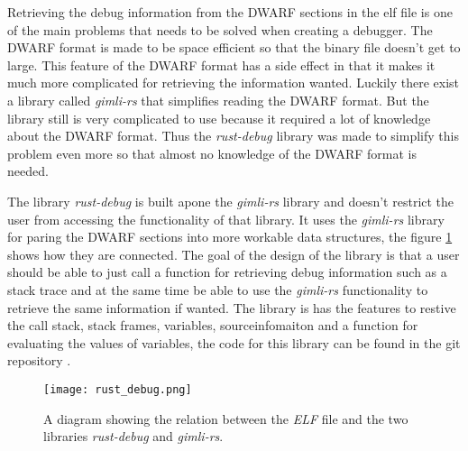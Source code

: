 
Retrieving the debug information from the \gls{DWARF} sections in the \gls{elf} file is one of the main problems that needs to be solved when creating a debugger.
The \gls{DWARF} format is made to be space efficient so that the binary file doesn't get to large.
This feature of the \gls{DWARF} format has a side effect in that it makes it much more complicated for retrieving the information wanted.
Luckily there exist a library called \emph{gimli-rs}\cite{gimli} that simplifies reading the \gls{DWARF} format.
But the library still is very complicated to use because it required a lot of knowledge about the \gls{DWARF} format.
Thus the \emph{rust-debug} library was made to simplify this problem even more so that almost no knowledge of the \gls{DWARF} format is needed.


The library \emph{rust-debug} is built apone the \emph{gimli-rs} library and doesn't restrict the user from accessing the functionality of that library.
It uses the \emph{gimli-rs} library for paring the \gls{DWARF} sections into more workable data structures, the figure \ref{fig:rustdebug} shows how they are connected.
The goal of the design of the library is that a user should be able to just call a function for retrieving debug information such as a stack trace and at the same time be able to use the \emph{gimli-rs} functionality to retrieve the same information if wanted.
The library is has the features to restive the call stack, stack frames, variables, sourceinfomaiton and a function for evaluating the values of variables, the code for this library can be found in the git repository \cite{rust-debug}.


\begin{figure}[h]
	\centering
	\texttt{[image: rust\_debug.png]}
	\caption{A diagram showing the relation between the \emph{ELF} file and the two libraries \emph{rust-debug} and \emph{gimli-rs}.}
	\label{fig:rustdebug}
\end{figure}


